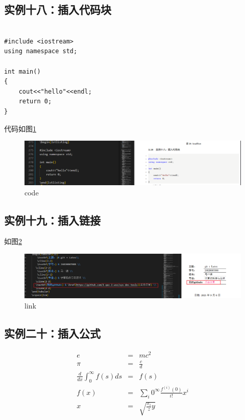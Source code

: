 \documentclass[a4paper]{article}
\begin{document}
\subsection{实例十八：插入代码块}

\begin{lstlisting}

#include <iostream>
using namespace std;

int main()
{
    cout<<"hello"<<endl;
    return 0;
}
\end{lstlisting}

代码如图\ref{code}
    \begin{figure}[H]
    \centering
    \includegraphics[width=1\textwidth]{images/code.png}
    \caption{code}
    \label{code}
    \end{figure}
\subsection{实例十九：插入链接}
如图\ref{link}
    \begin{figure}[H]
    \centering
    \includegraphics[width=1\textwidth]{images/link.png}
    \caption{link}
    \label{link}
    \end{figure}
\subsection{实例二十：插入公式}

\begin{eqnarray}
     e&=&mc^2 \\
     \pi&=&\frac{c}{d}\\
     \frac{d}{dx}\int_0^{\infty} f(s)ds&=&f(s)\\
     f(x)&=&\sum_{i} 0^{\infty}\frac{f^{(i)}(0)}{i!}x^i \\
     x&=&\sqrt{\frac{x_i}{z}y}
\end{eqnarray}
\end{document}
